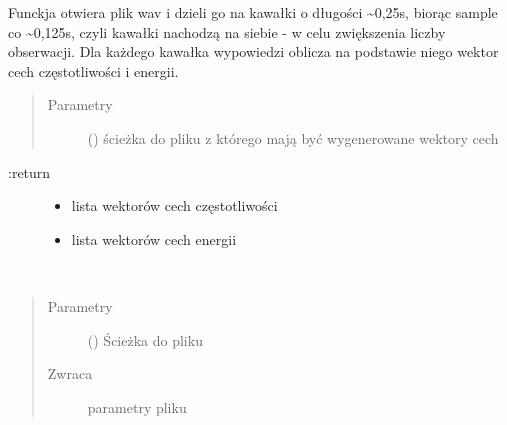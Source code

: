 \documentclass[letterpaper,10pt,polish]{sphinxmanual}
\begin{document}
\begin{fulllineitems}
\label{\detokenize{voice_module:voice_module.get_feature_vectors}}
Funckja otwiera plik wav i dzieli go na kawałki o długości \textasciitilde{}0,25s, biorąc sample co \textasciitilde{}0,125s, czyli
kawałki nachodzą na siebie - w celu zwiększenia liczby obserwacji.
Dla każdego kawałka wypowiedzi oblicza na podstawie niego wektor cech częstotliwości i energii.
\begin{quote}\begin{description}
\item[{Parametry}] \leavevmode
{} () \textendash{} ścieżka do pliku z którego mają być wygenerowane wektory cech

\end{description}\end{quote}
\begin{description}
\item[{:return}] \leavevmode\begin{itemize}
\item {} 
lista wektorów cech częstotliwości

\item {} 
lista wektorów cech energii

\end{itemize}

\end{description}

\end{fulllineitems}


\begin{fulllineitems}
\label{\detokenize{voice_module:voice_module.get_file_info}}~\begin{quote}\begin{description}
\item[{Parametry}] \leavevmode
{} () \textendash{} Ścieżka do pliku

\item[{Zwraca}] \leavevmode
parametry pliku

\end{description}\end{quote}

\end{fulllineitems}
\end{document}
